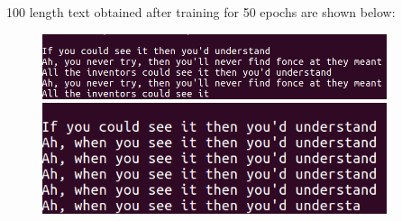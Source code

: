 \documentclass{article}
\begin{document}
\begin{flushleft}
100 length text obtained after training for 50 epochs are shown below:
\begin{figure}[H]
\begin{minipage}{0.475\textwidth}
\centering
\includegraphics[width=0.9\textwidth]{LSTM_text1.png}
\end{minipage}
\hfill
\begin{minipage}{0.475\textwidth}
\centering
\includegraphics[width=0.9\textwidth]{LSTM_text2.png}
\end{minipage}
\end{figure}
\end{flushleft}
\end{document}
